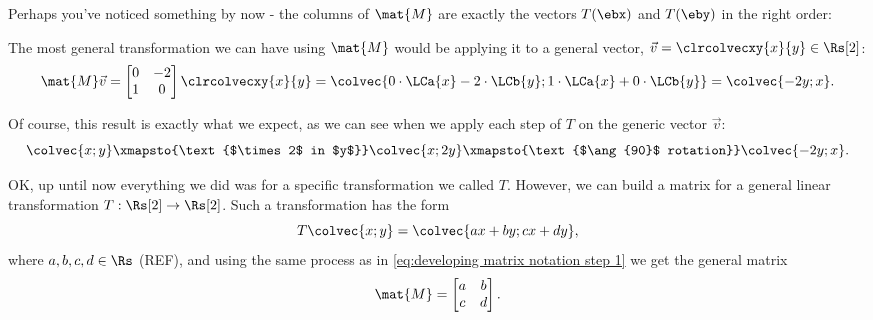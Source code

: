 Perhaps you've noticed something by now - the columns of $\mat{M}$ are exactly the vectors $T(\ebx)$ and $T(\eby)$ in the right order:

\begin{center}
\end{center}

The most general transformation we can have using $\mat{M}$ would be applying it to a general vector, $\vec{v}=\clrcolvecxy{x}{y}\in\Rs[2]$:
\begin{equation}
	\mat{M}\vec{v} = \begin{bmatrix}
		0 & -2 \\
		1 & 0
	\end{bmatrix}\clrcolvecxy{x}{y} = \colvec{0\cdot\LCa{x}-2\cdot\LCb{y};1\cdot\LCa{x}+0\cdot\LCb{y}} = \colvec{-2y;x}.
	\label{eq:applying M on a generic 2D vector}
\end{equation}

Of course, this result is exactly what we expect, as we can see when we apply each step of $T$ on the generic vector $\vec{v}$:
\begin{equation}
	\colvec{x;y} \xmapsto{\text{$\times 2$ in $y$}} \colvec{x;2y} \xmapsto{\text{$\ang{90}$ rotation}} \colvec{-2y;x}.
	\label{eq:}
\end{equation}

OK, up until now everything we did was for a specific transformation we called $T$. However, we can build a matrix for a general linear transformation $T:\Rs[2]\to\Rs[2]$. Such a transformation has the form
\begin{equation*}
	T\colvec{x;y} = \colvec{ax+by;cx+dy},
\end{equation*}
where $a,b,c,d\in\Rs$ (REF), and using the same process as in \autoref{eq:developing matrix notation step 1} we get the general matrix
\begin{equation}
	\mat{M} = \begin{bmatrix}
		a & b \\
		c & d
	\end{bmatrix}.
	\label{eq:general 2x2 matrix}
\end{equation}

